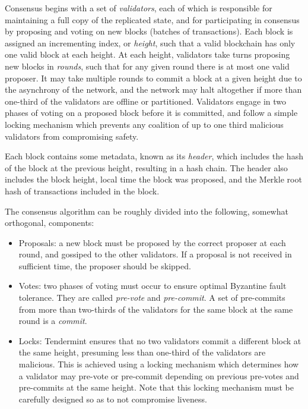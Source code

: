 Consensus begins with a set of \emph{validators}, each of which is responsible for maintaining a full copy of the replicated state,
and for participating in consensus by proposing and voting on new blocks (batches of transactions).
Each block is assigned an incrementing index, or \emph{height}, such that a valid blockchain has only one valid block at each height.
At each height, validators take turns proposing new blocks in \emph{rounds}, such that for any given round there is at most one valid proposer.
It may take multiple rounds to commit a block at a given height due to the asynchrony of the network,
and the network may halt altogether if more than one-third of the validators are offline or partitioned.
Validators engage in two phases of voting on a proposed block before it is committed, 
and follow a simple locking mechanism which prevents any coalition of up to one third malicious validators from compromising safety.

Each block contains some metadata, known as its \emph{header}, which includes the hash of the block at the previous height, resulting in a hash chain.
The header also includes the block height, local time the block was proposed, and the Merkle root hash of transactions included in the block.

The consensus algorithm can be roughly divided into the following, somewhat orthogonal, components:

\begin{itemize}

\item{Proposals: a new block must be proposed by the correct proposer at each round, and gossiped to the other validators. If a proposal is not received in sufficient time, the proposer should be skipped.}

\item{Votes: two phases of voting must occur to ensure optimal Byzantine fault tolerance. They are called \emph{pre-vote} and \emph{pre-commit}. A set of pre-commits from more than two-thirds of the validators for the same block at the same round is a \emph{commit}.}

\item{Locks: Tendermint ensures that no two validators commit a different block at the same height, presuming less than one-third of the validators are malicious. This is achieved using a locking mechanism which determines how a validator may pre-vote or pre-commit depending on previous pre-votes and pre-commits at the same height. Note that this locking mechanism must be carefully designed so as to not compromise liveness.}

\end{itemize}

